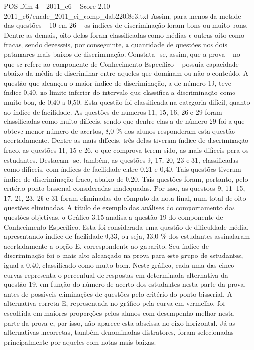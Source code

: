 \begin{textsample}{POS Dim 4 – 2011\_c6 – Score 2.00 – 2011\_c6/enade\_2011\_ci\_comp\_dab220f8e3.txt}
Assim, para menos da metade das questões – 10 em 26 – os índices de discriminação foram bons ou muito bons.
Dentre as demais, oito delas foram classificadas como médias e outras oito como fracas, sendo dezesseis, por conseguinte, a quantidade de questões nos dois patamares mais baixos de discriminação.
Constata -se, assim, que a prova – no que se refere ao componente de Conhecimento Específico – possuía capacidade abaixo da média de discriminar entre aqueles que dominam ou não o conteúdo.
A questão que alcançou o maior índice de discriminação, a de número 19, teve índice 0,40, no limite inferior do intervalo que classifica a discriminação como muito boa, de 0,40 a 0,50.
Esta questão foi classificada na categoria difícil, quanto ao índice de facilidade.
As questões de números 11, 15, 16, 26 e 29 foram classificadas como muito difíceis, sendo que dentre elas a de número 29 foi a que obteve menor número de acertos, 8,0 \% dos alunos responderam esta questão acertadamente.
Dentre as mais difíceis, três delas tiveram índice de discriminação fraco, as questões 11, 15 e 26, o que comprova terem sido, as mais difíceis para os estudantes.
Destacam -se, também, as questões 9, 17, 20, 23 e 31, classificadas como difíceis, com índices de facilidade entre 0,21 e 0,40.
Tais questões tiveram índice de discriminação fraco, abaixo de 0,20.
Tais questões foram, portanto, pelo critério ponto bisserial consideradas inadequadas.
Por isso, as questões 9, 11, 15, 17, 20, 23, 26 e 31 foram eliminadas do cômputo da nota final, num total de oito questões eliminadas.
A título de exemplo das análises do comportamento das questões objetivas, o Gráfico 3.15 analisa a questão 19 do componente de Conhecimento Específico.
Esta foi considerada uma questão de dificuldade média, apresentando índice de facilidade 0,33, ou seja, 33,0 \% dos estudantes assinalaram acertadamente a opção E, correspondente ao gabarito.
Seu índice de discriminação foi o mais alto alcançado na prova para este grupo de estudantes, igual a 0,40, classificado como muito bom.
Neste gráfico, cada uma das cinco curvas representa o percentual de respostas em determinada alternativa da questão 19, em função do número de acerto dos estudantes nesta parte da prova, antes de possíveis eliminações de questões pelo critério do ponto bisserial.
A alternativa correta E, representada no gráfico pela curva em vermelho, foi escolhida em maiores proporções pelos alunos com desempenho melhor nesta parte da prova e, por isso, não aparece esta abscissa no eixo horizontal.
Já as alternativas incorretas, também denominadas distratores, foram selecionadas principalmente por aqueles com notas mais baixas.

\end{textsample}
